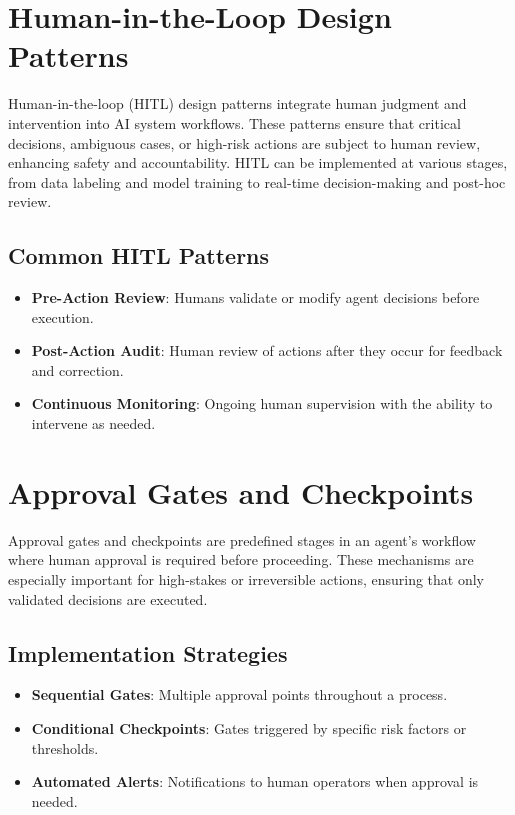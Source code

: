 
\begin{TNtwocol}

\section{Human-in-the-Loop Design Patterns}
Human-in-the-loop (HITL) design patterns integrate human judgment and intervention into AI system workflows. These patterns ensure that critical decisions, ambiguous cases, or high-risk actions are subject to human review, enhancing safety and accountability. HITL can be implemented at various stages, from data labeling and model training to real-time decision-making and post-hoc review.

\subsection{Common HITL Patterns}
\begin{itemize}
    \item \textbf{Pre-Action Review}: Humans validate or modify agent decisions before execution.
    \item \textbf{Post-Action Audit}: Human review of actions after they occur for feedback and correction.
    \item \textbf{Continuous Monitoring}: Ongoing human supervision with the ability to intervene as needed.
\end{itemize}

\section{Approval Gates and Checkpoints}
Approval gates and checkpoints are predefined stages in an agent’s workflow where human approval is required before proceeding. These mechanisms are especially important for high-stakes or irreversible actions, ensuring that only validated decisions are executed.

\subsection{Implementation Strategies}
\begin{itemize}
    \item \textbf{Sequential Gates}: Multiple approval points throughout a process.
    \item \textbf{Conditional Checkpoints}: Gates triggered by specific risk factors or thresholds.
    \item \textbf{Automated Alerts}: Notifications to human operators when approval is needed.
\end{itemize}


\end{TNtwocol}
